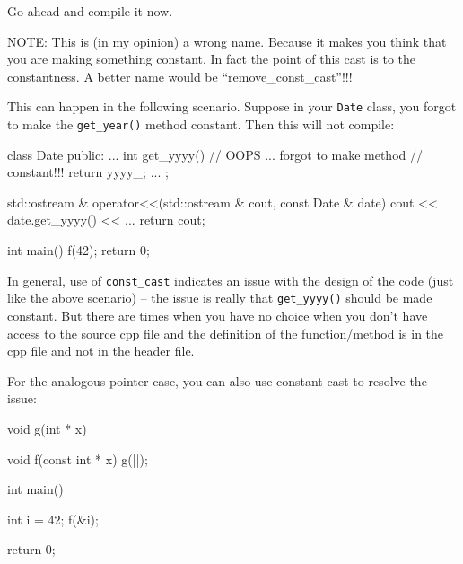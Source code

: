 
Go ahead and compile it now.

NOTE: This is (in my opinion) a wrong name. Because it makes you think that you are making something constant. In fact the point of this cast is to  the constantness. A better name would be ``remove\_const\_cast''!!!

This can happen in the following scenario. Suppose in your \texttt{Date} class, you forgot to make the \texttt{get\_year()} method constant. Then this will not compile:

\begin{console}
class Date
{
public:
     ...
     int get_yyyy() // OOPS ... forgot to make method
                    // constant!!!
     {
          return yyyy_;
     }
     ...
};

std::ostream & operator<<(std::ostream & cout,
                          const Date & date)
{    
     cout << date.get_yyyy()
          << ...
     return cout;
}

int main()
{   
    f(42);
    return 0;
}
\end{console}


In general, use of \texttt{const\_cast} indicates an issue with the design
of the code (just like the above scenario) -- the issue is really that
\texttt{get\_yyyy()} should be made constant. But there are times when you
have no choice when you don't have access to the source cpp file and the
definition of the function/method is in the cpp file and not in the
header file.

For the analogous pointer case, you can also use constant cast to
resolve the issue:

\begin{consolethree}[escapeinside=||]
void g(int * x)
{}

void f(const int * x)
{    
     g(|\EMPHASIZE{}|);
}

int main()
{   
    int i = 42;
    f(&i);

    return 0;
}
\end{consolethree}

